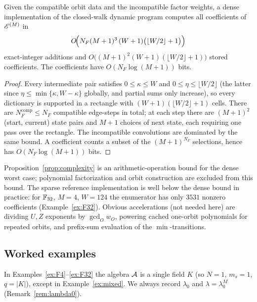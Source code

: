\begin{proposition}\label{prop:complexity}
Given the compatible orbit data and the incompatible factor weights, a dense implementation of the closed-walk dynamic
program computes all coefficients of $\mathscr E^{(M)}$ in
\[
O\!\Bigl(N_F(M+1)^3\,(W+1)\bigl(\lfloor W/2\rfloor+1\bigr)\Bigr)
\]
exact-integer additions and
$O\!\bigl((M+1)^2(W+1)(\lfloor W/2\rfloor+1)\bigr)$ stored coefficients.
The coefficients have $O(N_F\log(M+1))$ bits.
\end{proposition}

\begin{proof}
Every intermediate pair satisfies $0\leq\kappa\leq W$ and
$0\leq\eta\leq\lfloor W/2\rfloor$ (the latter since
$\eta\leq\min\{\kappa,W-\kappa\}$ globally, and partial sums only increase),
so every dictionary is supported in a rectangle with
$(W+1)(\lfloor W/2\rfloor+1)$ cells.  There are $N_F^{\mathrm{comp}}\leq N_F$
compatible edge-steps in total; at each step there are $(M+1)^2$
(start, current) state pairs and $M+1$ choices of next state, each requiring
one pass over the rectangle.  The incompatible convolutions are dominated by
the same bound.  A coefficient counts a subset of the $(M+1)^{N_F}$
selections, hence has $O(N_F\log(M+1))$ bits.
\end{proof}

Proposition~\ref{prop:complexity} is an arithmetic-operation bound for the
dense worst case; polynomial factorization and orbit construction are
excluded from this bound.  The sparse reference
implementation is well below the dense bound in practice: for
$\mathbb F_{32}$, $M=4$, $W=124$ the enumerator has only $3531$ nonzero coefficients
(Example~\ref{ex:F32}).  Obvious accelerations (not needed here) are dividing
$U,Z$ exponents by $\gcd_O w_O$, powering cached one-orbit polynomials for
repeated orbits, and prefix-sum evaluation of the $\min$-transitions.

\subsection{Worked examples}\label{sec:worked}

In Examples~\ref{ex:F4}--\ref{ex:F32} the algebra $\mathcal A$ is a single field $K$
(so $N=1$, $m_s=1$, $q=|K|$), except in Example~\ref{ex:mixed}.  We always
record $\lambda_0$ and $\lambda=\lambda_0^M$
(Remark~\ref{rem:lambda0}).

